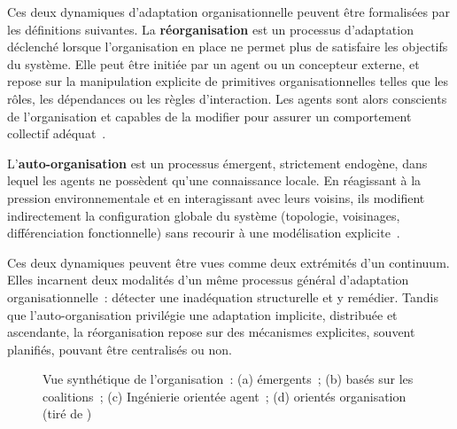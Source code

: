 Ces deux dynamiques d'adaptation organisationnelle peuvent être formalisées par les définitions suivantes. La \textbf{réorganisation} est un processus d'adaptation déclenché lorsque l'organisation en place ne permet plus de satisfaire les objectifs du système. Elle peut être initiée par un agent ou un concepteur externe, et repose sur la manipulation explicite de primitives organisationnelles telles que les rôles, les dépendances ou les règles d'interaction. Les agents sont alors conscients de l'organisation et capables de la modifier pour assurer un comportement collectif adéquat~\cite{Picard2009reorganisation}.

L'\textbf{auto-organisation} est un processus émergent, strictement endogène, dans lequel les agents ne possèdent qu'une connaissance locale. En réagissant à la pression environnementale et en interagissant avec leurs voisins, ils modifient indirectement la configuration globale du système (topologie, voisinages, différenciation fonctionnelle) sans recourir à une modélisation explicite~\cite{Picard2009reorganisation}.

Ces deux dynamiques peuvent être vues comme deux extrémités d'un continuum. Elles incarnent deux modalités d'un même processus général d'adaptation organisationnelle~: détecter une inadéquation structurelle et y remédier. Tandis que l'auto-organisation privilégie une adaptation implicite, distribuée et ascendante, la réorganisation repose sur des mécanismes explicites, souvent planifiés, pouvant être centralisés ou non.

\begin{figure}[h]
  \centering
  \resizebox{\textwidth}{!}{%
    
  }
  \caption{Vue synthétique de l'organisation~: (a)  émergents~; (b)  basés sur les coalitions~; (c) Ingénierie orientée agent~; (d)  orientés organisation (tiré de \cite{Picard2009reorganisation})}
  \label{fig:auto_vs_topdown}
\end{figure}



